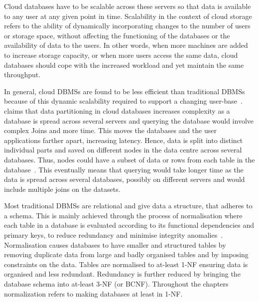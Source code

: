 Cloud databases have to be scalable across these servers so that data is
available to any user at any given point in time.  Scalability in the context of
cloud storage refers to the ability of dynamically incorporating changes to the
number of users or storage space,   without affecting the functioning of the
databases or the availability of data to the users.  In other words,   when more
machines are added to increase storage capacity,   or when more users access the
same data,   cloud databases should cope with the increased workload and yet
maintain the same throughput.

In general,   cloud \acp{DBMS} are found to be less efficient than traditional
\acp{DBMS} because of this dynamic scalability required to support a changing
user-base~\citep{Abadi,Hogan,Stonebraker}. \citet{Hogan} claims that data
partitioning in cloud databases increases complexity as a database is spread
across several servers and querying the database would involve complex Joins and
more time.  This moves the databases and the user applications farther apart,
increasing latency. Hence,   data is split into distinct
individual parts and saved on different nodes in the data centre across several
databases. Thus,   nodes could have a subset of data or rows from each table in
the database~\citep{dewitt}. This eventually means that querying would take
longer time as the data is spread across several databases, possibly on
different servers and would include multiple joins on the datasets.

Most traditional \acp{DBMS} are relational and give data a structure,   that
adheres to a schema.  This is mainly achieved through the process of
normalisation where each table in a database is evaluated according to its
functional dependencies and primary keys,   to reduce redundancy and minimise
integrity anomalies~\citep{Navathe}.  Normalisation causes databases to have
smaller and structured tables by removing duplicate data from large and badly
organised tables and by imposing constraints on the data.  Tables are normalised
to at-least \ac{1-NF} ensuring data is organised and less redundant.
Redundancy is further reduced by bringing the database schema into at-least
\ac{3-NF} (or \ac{BCNF}). Throughout the chapters normalization refers to making
databases at least in \ac{1-NF}.

